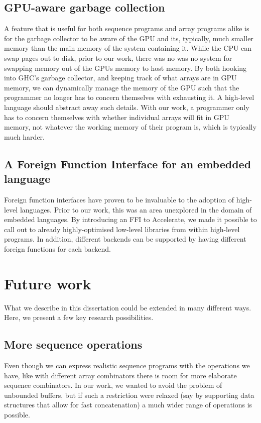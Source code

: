 \subsection{GPU-aware garbage collection}

A feature that is useful for both sequence programs and array programs alike is for the garbage collector to be aware of the GPU and its, typically, much smaller memory than the main memory of the system containing it. While the CPU can swap pages out to disk, prior to our work, there was no was no system for swapping memory out of the GPUs memory to host memory. By both hooking into GHC's garbage collector, and keeping track of what arrays are in GPU memory, we can dynamically manage the memory of the GPU such that the programmer no longer has to concern themselves with exhausting it. A high-level language should abstract away such details. With our work, a programmer only has to concern themselves with whether individual arrays will fit in GPU memory, not whatever the working memory of their program is, which is typically much harder.

\subsection{A Foreign Function Interface for an embedded language}

Foreign function interfaces have proven to be invaluable to the adoption of high-level languages\cite{Chakravarty:haskell-ffi}. Prior to our work, this was an area unexplored in the domain of embedded languages. By introducing an FFI to Accelerate, we made it possible to call out to already highly-optimised low-level libraries from within high-level programs. In addition, different backends can be supported by having different foreign functions for each backend.

\section{Future work}

What we describe in this dissertation could be extended in many different ways. Here, we present a few key research possibilities.

\subsection{More sequence operations}

Even though we can express realistic sequence programs with the operations we have, like with different array combinators there is room for more elaborate sequence combinators. In our work, we wanted to avoid the problem of unbounded buffers, but if such a restriction were relaxed (say by supporting data structures that allow for fast concatenation) a much wider range of operations is possible.

